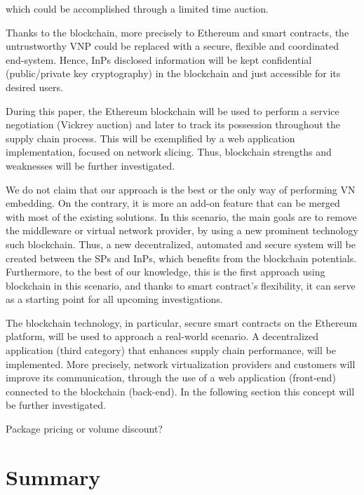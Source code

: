 which could be accomplished through a limited time auction.

Thanks to the blockchain, more precisely to Ethereum and smart contracts, the untrustworthy VNP could be replaced with a secure, flexible and coordinated end-system. Hence, InPs disclosed information will be kept confidential (public/private key cryptography) in the blockchain and just accessible for its desired users. 

During this paper, the Ethereum blockchain will be used to perform a service negotiation (Vickrey auction) and later to track its possession throughout the supply chain process. This will be exemplified by a web application implementation, focused on network slicing. Thus, blockchain strengths and weaknesses will be further investigated.
 
We do not claim that our approach is the best or the only way
of performing VN embedding. On the contrary, it is more an add-on feature that can be merged with most of the existing solutions. In this scenario, the main goals are to remove the middleware or virtual network provider, by using a new prominent technology such blockchain. Thus, a new decentralized, automated and secure system will be created between the SPs and InPs, which benefits from the blockchain potentials. Furthermore, to the best of our knowledge, this is the first approach using blockchain in this scenario, and thanks to smart contract's flexibility, it can serve as a starting point for all upcoming investigations.



The blockchain technology, in particular, secure smart contracts on the Ethereum platform, will be used to approach a real-world scenario. A decentralized application (third category) that enhances supply chain performance, will be implemented. More precisely, network virtualization providers and customers will improve its communication, through the use of a web application (front-end) connected to the blockchain (back-end). In the following section this concept will be further investigated.

Package pricing or volume discount?

\section{Summary}



